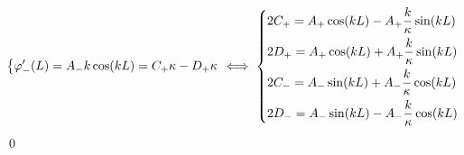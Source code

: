 \documentclass[uplatex,dvipdfmx,a4paper,11pt]{jlreq}
\makeatletter
\theoremstyle{definition}
\renewenvironment{proof}[1][\proofname]{\par
  \normalfont
  \topsep6\p@\@plus6\p@ \trivlist
  \item[\hskip\labelsep{\bfseries #1}\@addpunct{\bfseries}]\ignorespaces\quad\par
}{%
  \qed\endtrivlist\@endpefalse
}
\renewcommand\proofname{証明}
\makeatother
\begin{document}
\begin{proof}
\begin{align}
\begin{dcases}
      \varphi_-'(L) = A_-k\cos(kL) = C_+\kappa - D_+\kappa  \\
    \end{dcases}
    \iff
    \begin{dcases}
      2C_+ = A_+\cos(kL) - A_+\frac{k}{\kappa}\sin(kL) \\
      2D_+ = A_+\cos(kL) + A_+\frac{k}{\kappa}\sin(kL) \\
      2C_- = A_-\sin(kL) + A_-\frac{k}{\kappa}\cos(kL) \\
      2D_- = A_-\sin(kL) - A_-\frac{k}{\kappa}\cos(kL) \\
    \end{dcases}
  \end{align}
\end{proof}
\end{document}
